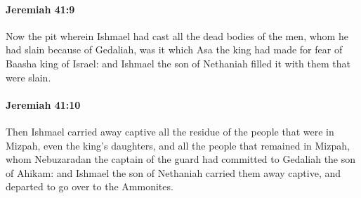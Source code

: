 		\paragraph{Jeremiah 41:9} %
			\label{JEREMIAH-41-9}

			Now the pit wherein Ishmael had cast all the dead bodies of the men, whom he had slain because of Gedaliah, was it which Asa the king had made for fear of Baasha king of Israel: and Ishmael the son of Nethaniah filled it with them that were slain.


		\paragraph{Jeremiah 41:10} %
			\label{JEREMIAH-41-10}

			Then Ishmael carried away captive all the residue of the people that were in Mizpah, even the king’s daughters, and all the people that remained in Mizpah, whom Nebuzaradan the captain of the guard had committed to Gedaliah the son of Ahikam: and Ishmael the son of Nethaniah carried them away captive, and departed to go over to the Ammonites.

